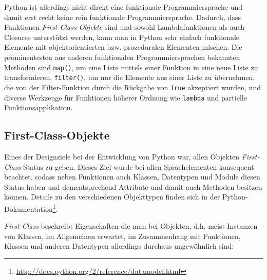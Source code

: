 \begin{description}
Python ist allerdings nicht direkt eine funktionale Programmiersprache und damit erst recht keine
rein funktionale Programmiersprache. Dadurch, dass Funktionen \emph{First-Class-Objekte} sind und
sowohl Lambdafunktionen als auch Closures unterstützt werden, kann man in Python sehr einfach
funktionale Elemente mit objektorientierten bzw. prozeduralen Elementen mischen. Die prominentesten
aus anderen funktionalen Programmiersprachen bekannten Methoden sind \lstinline{map()}, um eine
Liste mittels einer Funktion in eine neue Liste zu transformieren, \lstinline{filter()}, um nur die
Elemente aus einer Liste zu übernehmen, die von der Filter-Funktion durch die Rückgabe von
\lstinline{True} akzeptiert wurden, und diverse Werkzeuge für Funktionen höherer Ordnung wie
\lstinline{lambda} und partielle Funktionsapplikation.
\end{description}



\subsection{First-Class-Objekte}\label{firstclass}

Eines der Designziele bei der Entwicklung von Python war, allen Objekten \emph{First-Class}-Status
\citep{pyhist:firstclass} zu geben. Dieses Ziel wurde bei allen Sprachelementen konsequent beachtet,
sodass neben Funktionen auch Klassen, Datentypen und Module diesen Status haben und dementsprechend
Attribute und damit auch Methoden besitzen können. Details zu den verschiedenen Objekttypen finden
sich in der Python-Dokumentation\footnote{\href{http://docs.python.org/2/reference/datamodel.html}{http://docs.python.org/2/reference/datamodel.html}}.

\emph{First-Class} beschreibt Eigenschaften die man bei Objekten, d.h. meist Instanzen von Klassen,
im Allgemeinen erwartet, im Zusammenhang mit Funktionen, Klassen und anderen Datentypen allerdings
durchaus ungewöhnlich sind:

